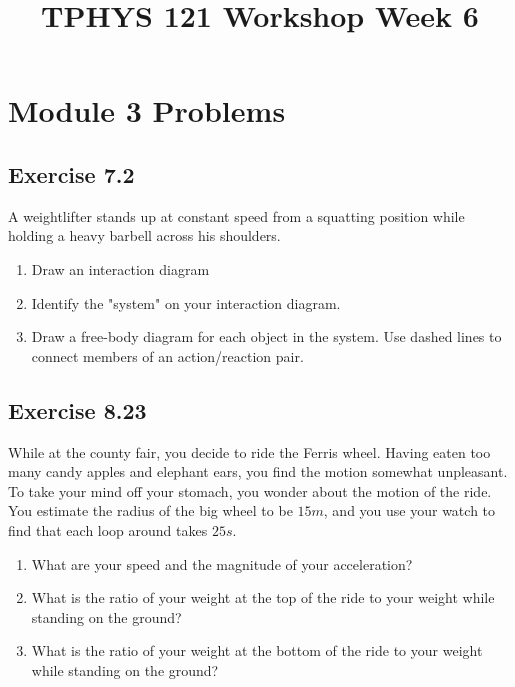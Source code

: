 \documentclass[11pt]{article}
\title{TPHYS 121 Workshop Week 6}
\author{}
\date{\vspace{-15ex}}
\newenvironment{exercise}{
    \begin{mdframed}[style=problemstyle]\textcolor{black}{}
}{
    \end{mdframed}
}
\begin{document}
\maketitle

\section*{Module 3 Problems}

\subsection*{Exercise 7.2}
\begin{exercise}
    A weightlifter stands up at constant speed from a squatting position while
    holding a heavy barbell across his shoulders.
    \begin{enumerate}[label=\alph*]
        \item Draw an interaction diagram
        \item Identify the "system" on your interaction diagram.
        \item Draw a free-body diagram for each object in the system. Use
            dashed lines to connect members of an action/reaction pair.
    \end{enumerate}
\end{exercise}

\subsection*{Exercise 8.23}
\begin{exercise}
    While at the county fair, you decide to ride the Ferris wheel. 
    Having eaten too many candy apples and elephant ears, you find the 
    motion somewhat unpleasant. To take your mind off your stomach, you 
    wonder about the motion of the ride. You estimate the radius of the 
    big wheel to be $15m$, and you use your watch to find that each loop 
    around takes $25s$.
    \begin{enumerate}[label=\alph*]
        \item What are your speed and the magnitude of your acceleration?
        \item What is the ratio of your weight at the top of the ride to 
            your weight while standing on the ground?
        \item What is the ratio of your weight at the bottom of the ride 
            to your weight while standing on the ground?
    \end{enumerate}
\end{exercise}
\end{document}
